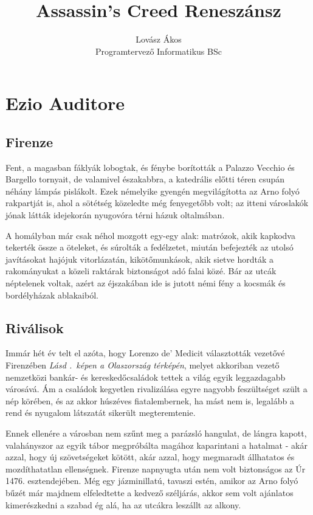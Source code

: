 \documentclass{thesis-ekf}
\institute{Matematikai és Informatikai Intézet}
\title{Assassin's Creed Reneszánsz}
\author{Lovász Ákos\\Programtervező Informatikus BSc}
\date{\the\year{}}
\theoremstyle{definition}
\theoremstyle{remark}
\begin{document}
\maketitle
\tableofcontents


\chapter{Ezio Auditore}
\section{Firenze}
Fent, a magasban fáklyák lobogtak, és fénybe borították a Palazzo Vecchio és Bargello tornyait, de valamivel északabbra, a katedrális előtti téren csupán néhány lámpás pislákolt. Ezek némelyike gyengén megvilágította az Arno folyó rakpartját is, ahol a sötétség közeledte még fenyegetőbb volt; az itteni városlakók jónak látták idejekorán nyugovóra  térni  házuk  oltalmában. 

A homályban  már  csak  néhol mozgott  egy-egy  alak:  matrózok,  akik  kapkodva  tekerték  össze  a öteleket, és  súrolták  a  fedélzetet,  miután  befejezték  az  utolsó javításokat hajójuk vitorlázatán, kikötőmunkások, akik sietve hordták a rakományukat a közeli
raktárak biztonságot adó falai közé. Bár az utcák néptelenek voltak, azért az éjszakában ide is jutott némi fény a kocsmák és bordélyházak ablakaiból.

\section{Riválisok}
Immár hét év telt el azóta, hogy Lorenzo de' Medicit választották 
vezetővé Firenzében \emph{Lásd \az{\ref{abra-olasz}}.~képen a Olaszország térképén}, melyet akkoriban vezető nemzetközi bankár- és 
kereskedőcsaládok tettek a világ egyik leggazdagabb városává. Ám a 
családok kegyetlen rivalizálása egyre  nagyobb  feszültséget szült a 
nép körében, és az akkor húszéves fiatalembernek, ha mást nem is, 
legalább a rend és nyugalom látszatát sikerült megteremtenie. 

Ennek ellenére a városban nem szűnt meg a parázsló hangulat, de lángra 
kapott,  valahányszor  az  egyik  tábor  megpróbálta  magához 
kaparintani  a hatalmat - akár azzal, hogy új  szövetségeket kötött, 
akár azzal, hogy megmaradt állhatatos és mozdíthatatlan ellenségnek. 
Firenze  napnyugta  után  nem  volt  biztonságos  az  Úr  1476. 
esztendejében. Még egy jázminillatú, tavaszi estén, amikor az Arno 
folyó bűzét már majdnem elfeledtette a kedvező széljárás, akkor sem 
volt ajánlatos kimerészkedni a szabad ég alá, ha az utcákra leszállt az 
alkony. 
\end{document}
